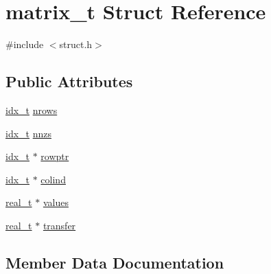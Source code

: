 \hypertarget{structmatrix__t}{}\section{matrix\+\_\+t Struct Reference}
\label{structmatrix__t}


{\ttfamily \#include $<$struct.\+h$>$}

\subsection*{Public Attributes}
\begin{DoxyCompactItemize}
\item 
\hyperlink{3rd_party_2parmetis-4_80_83_2metis_2include_2metis_8h_aaa5262be3e700770163401acb0150f52}{idx\+\_\+t} \hyperlink{structmatrix__t_ac20aa30eed145aeee3a266fbea756769}{nrows}
\item 
\hyperlink{3rd_party_2parmetis-4_80_83_2metis_2include_2metis_8h_aaa5262be3e700770163401acb0150f52}{idx\+\_\+t} \hyperlink{structmatrix__t_afd8bba971cd6b6099b02bc3bf5947dd3}{nnzs}
\item 
\hyperlink{3rd_party_2parmetis-4_80_83_2metis_2include_2metis_8h_aaa5262be3e700770163401acb0150f52}{idx\+\_\+t} $\ast$ \hyperlink{structmatrix__t_a824811193a913c152603e16be365dcca}{rowptr}
\item 
\hyperlink{3rd_party_2parmetis-4_80_83_2metis_2include_2metis_8h_aaa5262be3e700770163401acb0150f52}{idx\+\_\+t} $\ast$ \hyperlink{structmatrix__t_aab46086683162c3433675e82a035c322}{colind}
\item 
\hyperlink{3rd_party_2parmetis-4_80_83_2metis_2include_2metis_8h_a1924a4f6907cc3833213aba1f07fcbe9}{real\+\_\+t} $\ast$ \hyperlink{structmatrix__t_a9a918d16aa3d96259a8ff5491870685b}{values}
\item 
\hyperlink{3rd_party_2parmetis-4_80_83_2metis_2include_2metis_8h_a1924a4f6907cc3833213aba1f07fcbe9}{real\+\_\+t} $\ast$ \hyperlink{structmatrix__t_ae7a45331b8f617a43a9f244561b22191}{transfer}
\end{DoxyCompactItemize}


\subsection{Member Data Documentation}
\mbox{\label{structmatrix__t_aab46086683162c3433675e82a035c322}} 
